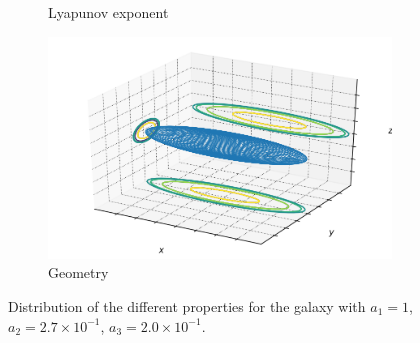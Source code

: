 \begin{figure}[h]
\begin{subfigure}[t]{0.4\textwidth}
        \caption{Lyapunov exponent}
    \end{subfigure}
    \begin{subfigure}[t]{0.4\textwidth}
        \includegraphics[width=\textwidth]{"../Files/Week 13/images/6_ellipsoid"}
        \caption{Geometry}
    \end{subfigure}
    \caption{Distribution of the different properties for the galaxy with $a_1 = 1$, $a_2 = 2.7\times10^{-1}$, $a_3 = 2.0\times10^{-1}$.}
    \label{fig: g22}
\end{figure}


